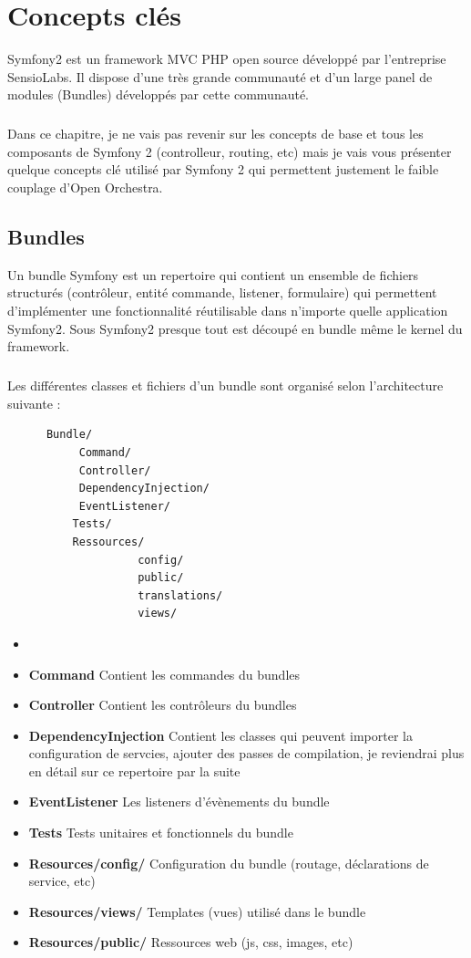 \chapter{Concepts clés}
Symfony2 est un framework MVC PHP open source développé par l'entreprise SensioLabs. Il dispose d'une très grande communauté et d'un large panel de modules (\og{}Bundles\fg{}) développés par cette communauté.
\paragraph{}
Dans ce chapitre, je ne vais pas revenir sur les concepts de base et tous les composants de Symfony 2 (controlleur, routing, etc) mais je vais vous présenter quelque concepts clé utilisé par Symfony 2 qui permettent justement le faible couplage d'Open Orchestra.
\section{Bundles}
\label{bundle}
Un bundle Symfony est un repertoire qui contient un ensemble de fichiers structurés (contrôleur, entité commande, listener, formulaire) qui permettent d'implémenter une fonctionnalité réutilisable dans n'importe quelle application Symfony2. Sous Symfony2 presque tout est découpé en bundle même le kernel du framework.
\paragraph{}
Les différentes classes et fichiers d'un bundle sont organisé selon l'architecture suivante : 

\begin{verbatim}
      Bundle/
           Command/  
           Controller/
           DependencyInjection/
           EventListener/
          Tests/
          Ressources/
                    config/
                    public/
                    translations/
                    views/
\end{verbatim}
\begin{itemize}
\item[]
\item \textbf{Command} Contient les commandes du bundles
\item \textbf{Controller} Contient les contrôleurs du bundles
\item \textbf{DependencyInjection} Contient les classes qui peuvent importer la configuration de servcies, ajouter des passes de compilation, je reviendrai plus en détail sur ce repertoire par la suite
\item \textbf{EventListener} Les listeners d'évènements du bundle
\item \textbf{Tests} Tests unitaires et fonctionnels du bundle
\item \textbf{Resources/config/} Configuration du bundle (routage, déclarations de service, etc)
\item \textbf{Resources/views/} Templates (vues) utilisé dans le bundle
\item \textbf{Resources/public/} Ressources web (js, css, images, etc)
\end{itemize}
